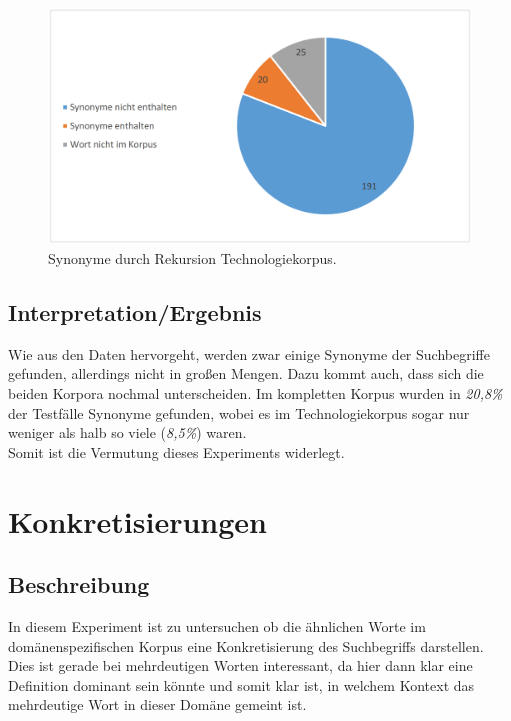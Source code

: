 \documentclass[12pt,a4paper]{report}
\begin{document}
\begin{figure}[p]
  \begin{center}
	\includegraphics[scale=0.4]{SynonymTech.PNG}
  \end{center}  
  \caption{Synonyme durch Rekursion Technologiekorpus.}
  
\end{figure}
		\subsection{Interpretation/Ergebnis}
		Wie aus den Daten hervorgeht, werden zwar einige Synonyme der Suchbegriffe gefunden, allerdings nicht in großen Mengen. Dazu kommt auch, dass sich die beiden Korpora nochmal unterscheiden. Im kompletten Korpus wurden in \textit{20,8\%} der Testfälle Synonyme gefunden, wobei es im Technologiekorpus sogar nur weniger als halb so viele (\textit{8,5\%}) waren.\\
		
		Somit ist die Vermutung dieses Experiments widerlegt.
		
		
	\newpage
	\section{Konkretisierungen}
		\subsection{Beschreibung}
		In diesem Experiment ist zu untersuchen ob die ähnlichen Worte im domänenspezifischen Korpus eine Konkretisierung des Suchbegriffs darstellen.\\
		Dies ist gerade bei mehrdeutigen Worten interessant, da hier dann klar eine Definition dominant sein könnte und somit klar ist, in welchem Kontext das mehrdeutige Wort in dieser Domäne gemeint ist.\\
\end{document}
